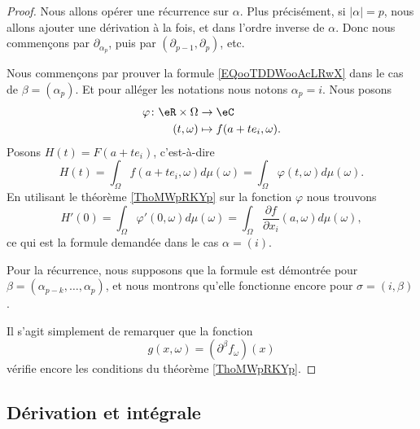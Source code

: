 \begin{proof}
	Nous allons opérer une récurrence sur \( \alpha\). Plus précisément, si \( | \alpha |=p\), nous allons ajouter une dérivation à la fois, et dans l'ordre inverse de \( \alpha\). Donc nous commençons par \( \partial_{\alpha_p}\), puis par \( (\partial_{p-1}, \partial_p)\), etc.

	Nous commençons par prouver la formule \eqref{EQooTDDWooAcLRwX} dans le cas de \( \beta=(\alpha_p)\). Et pour alléger les notations nous notons \( \alpha_p=i\). Nous posons
	\begin{equation}
		\begin{aligned}
			\varphi\colon \eR\times \Omega & \to \eC                   \\
			(t,\omega)                     & \mapsto f(a+te_i,\omega).
		\end{aligned}
	\end{equation}
	Posons \( H(t)=F(a+te_i)\), c'est-à-dire
	\begin{equation}
		H(t)=\int_{\Omega}f(a+te_i,\omega)d\mu(\omega)=\int_{\Omega}\varphi(t,\omega)d\mu(\omega).
	\end{equation}
	En utilisant le théorème \ref{ThoMWpRKYp} sur la fonction \( \varphi\) nous trouvons
	\begin{equation}
		H'(0)=\int_{\Omega}\varphi'(0,\omega)d\mu(\omega)=\int_{\Omega}\frac{ \partial f }{ \partial x_i }(a,\omega)d\mu(\omega),
	\end{equation}
	ce qui est la formule demandée dans le cas \( \alpha=(i)\).

	Pour la récurrence, nous supposons que la formule est démontrée pour \( \beta=(\alpha_{p-k},\ldots, \alpha_p)\), et nous montrons qu'elle fonctionne encore pour \( \sigma=(i, \beta)\).

	Il s'agit simplement de remarquer que la fonction
	\begin{equation}
		g(x,\omega)=(\partial^{\beta}f_{\omega})(x)
	\end{equation}
	vérifie encore les conditions du théorème \ref{ThoMWpRKYp}.
\end{proof}

\subsection{Dérivation et intégrale}


